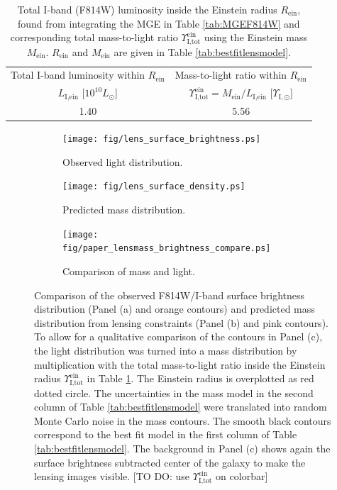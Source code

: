 
\begin{table}
\centering
\caption{Total I-band (F814W) luminosity inside the Einstein radius $R_\text{ein}$, found from integrating the MGE in Table \ref{tab:MGEF814W} and corresponding total mass-to-light ratio $\Upsilon_\text{I,tot}^\text{ein}$ using the Einstein mass $M_\text{ein}$. $R_\text{ein}$ and $M_\text{ein}$ are given in Table \ref{tab:bestfitlensmodel}.}
\begin{tabular}{cc}
\hline
Total I-band luminosity within $R_\text{ein}$ & Mass-to-light ratio within $R_\text{ein}$\\
 $L_\text{I,ein}$ [$10^{10} L_\odot$] & $\Upsilon_\text{I,tot}^\text{ein} = M_\text{ein} / L_\text{I,ein}$ [$\Upsilon_{\text{I},\odot}$]\\\hline
1.40 & 5.56\\\hline
\end{tabular}  
\label{tab:einsteinML} 
\end{table}


\begin{figure}
\centering
\begin{subfigure}{.3\textwidth}
  \centering
  \texttt{[image: fig/lens\_surface\_brightness.ps]}
  \caption{Observed light distribution.}
  \label{fig:lenscomparelight}
\end{subfigure}%
\begin{subfigure}{.3\textwidth}
  \centering
  \texttt{[image: fig/lens\_surface\_density.ps]}
  \caption{Predicted mass distribution.}
  \label{fig:lenscomparemass}
\end{subfigure}
\begin{subfigure}{.3\textwidth}
  \centering
  \texttt{[image: fig/paper\_lensmass\_brightness\_compare.ps]}
  \caption{Comparison of mass and light.}
  \label{fig:lenscompareboth}
\end{subfigure}
\caption{Comparison of the observed F814W/I-band surface brightness distribution (Panel (a) and orange contours) and predicted mass distribution from lensing constraints (Panel (b) and pink contours). To allow for a qualitative comparison of the contours in Panel (c), the light distribution was turned into a mass distribution by multiplication with the total mass-to-light ratio inside the Einstein radius $\Upsilon_\text{I,tot}^\text{ein}$ in Table \ref{tab:einsteinML}. The Einstein radius is overplotted as red dotted circle. The uncertainties in the mass model in the second column of Table \ref{tab:bestfitlensmodel} were translated into random Monte Carlo noise in the mass contours. The smooth black contours correspond to the best fit model in the first column of Table \ref{tab:bestfitlensmodel}. The background in Panel (c) shows again the surface brightness subtracted center of the galaxy to make the lensing images visible. [TO DO: use $\Upsilon_\text{I,tot}^\text{ein}$ on colorbar]}
\label{fig:lenslightcompareALL}
\end{figure}
